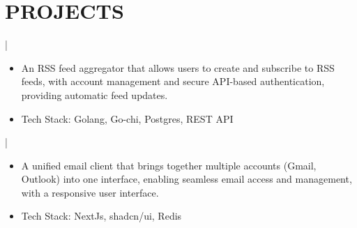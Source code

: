 \documentclass[]{resume}
\begin{document}
\section{PROJECTS}
 | \href{https://github.com/saswatax/rss-aggregator}{\faGithub}
\begin{itemize}
  \item An RSS feed aggregator that allows users to create and subscribe to RSS feeds, with account management and secure API-based authentication, providing automatic feed updates.
  \item Tech Stack: Golang, Go-chi, Postgres, REST API
\end{itemize}
 | \href{https://github.com/saswatax/email-client}{\faGithub}
\begin{itemize}
  \item A unified email client that brings together multiple accounts (Gmail, Outlook) into one interface, enabling seamless email access and management, with a responsive user interface.
  \item Tech Stack: NextJs, shadcn/ui, Redis
\end{itemize}
\end{document}
